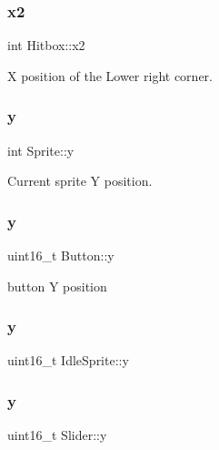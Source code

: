 \subsubsection{\texorpdfstring{x2}{x2}}
{\footnotesize\ttfamily int Hitbox\+::x2}



X position of the Lower right corner. 

\mbox{\label{group__sprite_ga363e26017ee2aaed8636f7dab92af2cd}} 
\subsubsection{\texorpdfstring{y}{y}\hspace{0.1cm}{\footnotesize\ttfamily [1/4]}}
{\footnotesize\ttfamily int Sprite\+::y}



Current sprite Y position. 

\mbox{\label{group__sprite_ga0e057db96fd0683cd5236af8921671a6}} 
\subsubsection{\texorpdfstring{y}{y}\hspace{0.1cm}{\footnotesize\ttfamily [2/4]}}
{\footnotesize\ttfamily uint16\+\_\+t Button\+::y}



button Y position 

\mbox{\label{group__sprite_ga63da8969e319d653ed0608c49056bcde}} 
\subsubsection{\texorpdfstring{y}{y}\hspace{0.1cm}{\footnotesize\ttfamily [3/4]}}
{\footnotesize\ttfamily uint16\+\_\+t Idle\+Sprite\+::y}

\mbox{\label{group__sprite_ga4568c992e8bb68bfdf407242af502928}} 
\subsubsection{\texorpdfstring{y}{y}\hspace{0.1cm}{\footnotesize\ttfamily [4/4]}}
{\footnotesize\ttfamily uint16\+\_\+t Slider\+::y}



